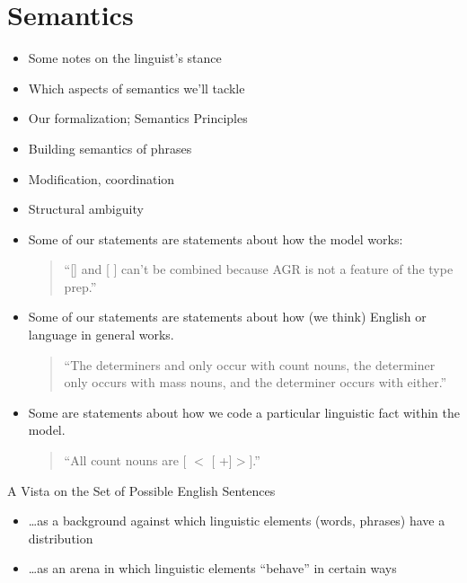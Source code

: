 \documentclass[a4paper,landscape,headrule,footrule,dvips]{foils}
\begin{document}
\section{Semantics}

\begin{itemize}
\item Some notes on the linguist's stance
\item Which aspects of semantics we’ll tackle
\item Our formalization; Semantics Principles
\item Building semantics of phrases
\item Modification, coordination
\item Structural ambiguity
\end{itemize}



\begin{itemize}
\item Some of our statements are statements about how the model
works:
\begin{quote}
  “[] and [ ] can’t be combined because AGR is not a
  feature of the type prep.”
\end{quote}
\item Some of our statements are statements about how (we think)
English or language in general works.
\begin{quote}
  “The determiners  and  only occur with count nouns, the
  determiner  only occurs with mass nouns, and the determiner 
  occurs with either.”
\end{quote}
\item Some are statements about how we code a particular
linguistic fact within the model.
\begin{quote}
  “All count nouns are [  $<$ [ +]$>$].”
\end{quote}
\end{itemize}


A Vista on the Set of Possible English Sentences
\begin{itemize}
\item \ldots  as a background against which linguistic
  elements (words, phrases) have a distribution
\item \ldots  as an arena in which linguistic elements
  “behave” in certain ways
\end{itemize}
\end{document}

